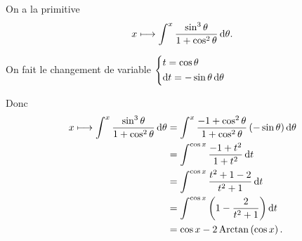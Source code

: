 \begin{corr}
On a la primitive \[x\mapsto\int^x\dfrac{\sin^3\theta}{1+\cos^2\theta}\odif{\theta}.\]

On fait le changement de variable \(\begin{dcases}t=\cos\theta \\ \odif{t}=-\sin\theta\odif{\theta}\end{dcases}\)

Donc \[\begin{aligned}
x\mapsto\int^x\dfrac{\sin^3\theta}{1+\cos^2\theta}\odif{\theta}&=\int^x\dfrac{-1+\cos^2\theta}{1+\cos^2\theta}\paren{-\sin\theta}\odif{\theta} \\
&=\int^{\cos x}\dfrac{-1+t^2}{1+t^2}\odif{t} \\
&=\int^{\cos x}\dfrac{t^2+1-2}{t^2+1}\odif{t} \\
&=\int^{\cos x}\paren{1-\dfrac{2}{t^2+1}}\odif{t} \\
&=\cos x-2\Arctan\paren{\cos x}.
\end{aligned}\]
\end{corr}